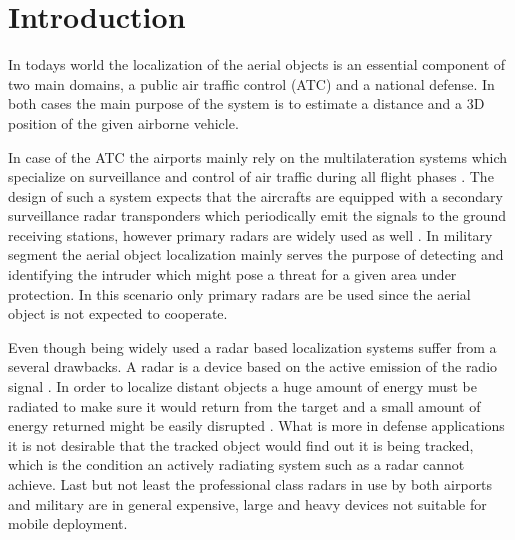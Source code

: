 

\setcounter{secnumdepth}{2}


\chapter{Introduction}

In todays world the localization of the aerial objects is an essential component of two main domains, a public air traffic control (ATC) and a national defense. In both cases the main purpose of the system is to estimate a distance and a 3D position of the given airborne vehicle.

In case of the ATC the airports mainly rely on the multilateration systems which specialize on surveillance and control of air traffic during all flight phases \cite{Gaviria:newStrategiesMLAT}. The design of such a system expects that the aircrafts are equipped with a secondary surveillance radar transponders which periodically emit the signals to the ground receiving stations, however primary radars are widely used as well \cite{Airtrafficmuseum}. In military segment the aerial object localization mainly serves the purpose of detecting and identifying the intruder which might pose a threat for a given area under protection. In this scenario only primary radars are be used since the aerial object is not expected to cooperate.

Even though being widely used a radar based localization systems suffer from a several drawbacks. A radar is a device based on the active emission of the radio signal \cite{toomay2012radar}. In order to localize distant objects a huge amount of energy must be radiated to make sure it would return from the target and a small amount of energy returned might be easily disrupted \cite{Airtrafficmuseum}. What is more in defense applications it is not desirable that the tracked object would find out it is being tracked, which is the condition an actively radiating system such as a radar cannot achieve. Last but not least the professional class radars in use by both airports and military are in general expensive, large and heavy devices not suitable for mobile deployment.

